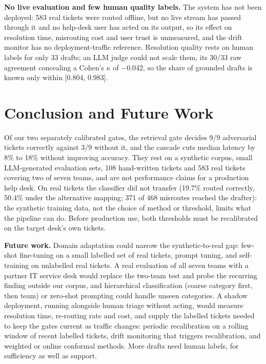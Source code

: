 \documentclass[conference,a4paper]{IEEEtran}
\begin{document}
\textbf{No live evaluation and few human quality labels.} The system has not been deployed: 583 real tickets were routed offline, but no live stream has passed through it and no help-desk user has acted on its output, so its effect on resolution time, misrouting cost and user trust is unmeasured, and the drift monitor has no deployment-traffic reference. Resolution quality rests on human labels for only 33 drafts; an LLM judge could not scale them, its 30/33 raw agreement concealing a Cohen's $\kappa$ of $-$0.042, so the share of grounded drafts is known only within [0.804, 0.983].

\section{Conclusion and Future Work}\label{sec:concl}

Of our two separately calibrated gates, the retrieval gate decides 9/9 adversarial tickets correctly against 3/9 without it, and the cascade cuts median latency by 8\% to 18\% without improving accuracy. They rest on a synthetic corpus, small LLM-generated evaluation sets, 108 hand-written tickets and 583 real tickets covering two of seven teams, and are not performance claims for a production help desk. On real tickets the classifier did not transfer (19.7\% routed correctly, 50.4\% under the alternative mapping; 371 of 468 misroutes reached the drafter): the synthetic training data, not the choice of method or threshold, limits what the pipeline can do. Before production use, both thresholds must be recalibrated on the target desk's own tickets.

\textbf{Future work.} Domain adaptation could narrow the synthetic-to-real gap: few-shot fine-tuning on a small labelled set of real tickets, prompt tuning, and self-training on unlabelled real tickets. A real evaluation of all seven teams with a partner IT service desk would replace the two-team test and probe the recurring finding outside our corpus, and hierarchical classification (coarse category first, then team) or zero-shot prompting could handle unseen categories. A shadow deployment, running alongside human triage without acting, would measure resolution time, re-routing rate and cost, and supply the labelled tickets needed to keep the gates current as traffic changes: periodic recalibration on a rolling window of recent labelled tickets, drift monitoring that triggers recalibration, and weighted \cite{b9} or online \cite{b11} conformal methods. More drafts need human labels, for sufficiency as well as support.
\end{document}
